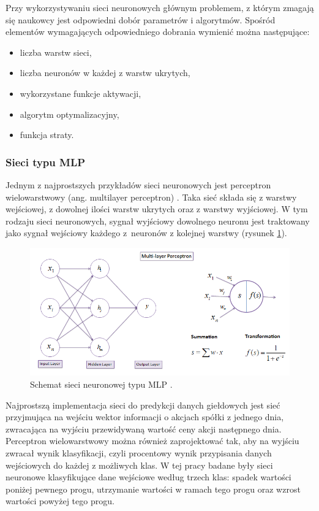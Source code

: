 \documentclass[a4paper, twoside, 11pt, openright]{article}
\begin{document}
\bigskip

Przy wykorzystywaniu sieci neuronowych głównym problemem, z którym zmagają się naukowcy jest odpowiedni dobór parametrów i algorytmów. Spośród elementów wymagających odpowiedniego dobrania wymienić można następujące:
\begin{itemize}
\item liczba warstw sieci,
\item liczba neuronów w każdej z warstw ukrytych,
\item wykorzystane funkcje aktywacji,
\item algorytm optymalizacyjny,
\item funkcja straty.
\end{itemize}


\subsubsection{Sieci typu MLP}

Jednym z najprostszych przykładów sieci neuronowych jest perceptron wielowarstwowy (ang. multilayer perceptron) \cite{mlp}. Taka sieć składa się z warstwy wejściowej, z dowolnej ilości warstw ukrytych oraz z warstwy wyjściowej. W tym rodzaju sieci neuronowych, sygnał wyjściowy dowolnego neuronu jest traktowany jako sygnał wejściowy każdego z~neuronów z kolejnej warstwy (rysunek \ref{img:neural-net}). 

\bigskip

\begin{figure}[H]
\centering \includegraphics[scale=0.7]{img/nn.png}
\caption{Schemat sieci neuronowej typu MLP \cite{mlpnn}.}
\label{img:neural-net}
\end{figure}

Najprostszą implementacja sieci do predykcji danych giełdowych jest sieć przyjmująca na wejściu wektor informacji o akcjach spółki z jednego dnia, zwracająca na wyjściu przewidywaną wartość ceny akcji następnego dnia. Perceptron wielowarstwowy można również zaprojektować tak, aby na wyjściu zwracał wynik klasyfikacji, czyli procentowy wynik przypisania danych wejściowych do każdej z możliwych klas. W tej pracy badane były sieci neuronowe klasyfikujące dane wejściowe według trzech klas: spadek wartości poniżej pewnego progu, utrzymanie wartości w ramach tego progu oraz wzrost wartości powyżej tego progu. 
\end{document}
